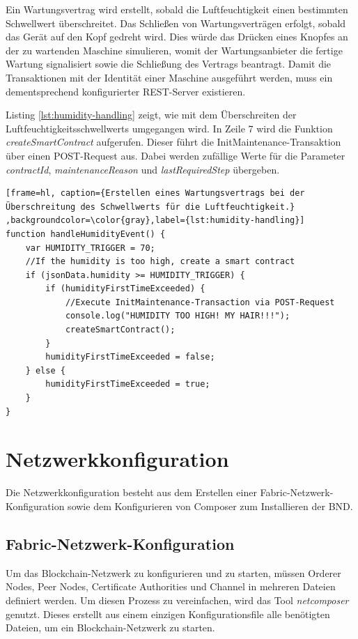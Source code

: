Ein Wartungsvertrag wird erstellt, sobald die Luftfeuchtigkeit einen bestimmten Schwellwert überschreitet. Das Schließen von Wartungsverträgen erfolgt, sobald das Gerät auf den Kopf gedreht wird. Dies würde das Drücken eines Knopfes an der zu wartenden Maschine simulieren, womit der Wartungsanbieter die fertige Wartung signalisiert sowie die Schließung des Vertrags beantragt. Damit die Transaktionen mit der Identität einer Maschine ausgeführt werden, muss ein dementsprechend konfigurierter REST-Server existieren. 

Listing \ref{lst:humidity-handling} zeigt, wie mit dem Überschreiten der Luftfeuchtigkeitsschwellwerts umgegangen wird. In Zeile 7 wird die Funktion \textit{createSmartContract} aufgerufen. Dieser führt die InitMaintenance-Transaktion über einen POST-Request aus. Dabei werden zufällige Werte für die Parameter \textit{contractId}, \textit{maintenanceReason} und \textit{lastRequiredStep} übergeben.

\begin{lstfloat}
\begin{lstlisting}[frame=hl, caption={Erstellen eines Wartungsvertrags bei der Überschreitung des Schwellwerts für die Luftfeuchtigkeit.} ,backgroundcolor=\color{gray},label={lst:humidity-handling}]
function handleHumidityEvent() {
    var HUMIDITY_TRIGGER = 70;
    //If the humidity is too high, create a smart contract
    if (jsonData.humidity >= HUMIDITY_TRIGGER) {
        if (humidityFirstTimeExceeded) {
            //Execute InitMaintenance-Transaction via POST-Request
            console.log("HUMIDITY TOO HIGH! MY HAIR!!!");
            createSmartContract(); 
        }
        humidityFirstTimeExceeded = false;
    } else {
        humidityFirstTimeExceeded = true;
    }
}
\end{lstlisting} 
\end{lstfloat}

\section{Netzwerkkonfiguration}
\label{sec:network-config}
Die Netzwerkkonfiguration besteht aus dem Erstellen einer Fabric-Netzwerk-Konfiguration sowie dem Konfigurieren von Composer zum Installieren der \acs{BND}. 

\subsection{Fabric-Netzwerk-Konfiguration}
Um das Blockchain-Netzwerk zu konfigurieren und zu starten, müssen Orderer Nodes, Peer Nodes, Certificate Authorities und Channel in mehreren Dateien definiert werden. Um diesen Prozess zu vereinfachen, wird das Tool \textit{netcomposer}\cite{IBMSilvergateTeamnetcomposerGithubRepository2018} genutzt. Dieses erstellt aus einem einzigen Konfigurationsfile alle benötigten Dateien, um ein Blockchain-Netzwerk zu starten. 


